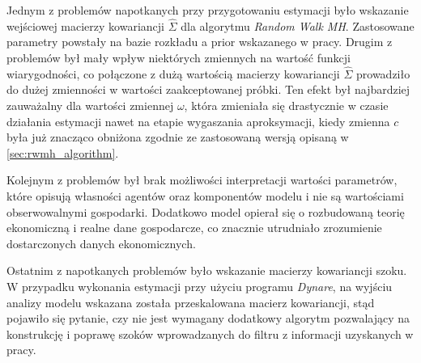 Jednym z problemów napotkanych przy przygotowaniu estymacji było wskazanie wejściowej macierzy kowariancji $\hat{\Sigma}$ dla algorytmu \emph{Random Walk MH}. Zastosowane parametry powstały na bazie rozkładu a prior wskazanego w pracy. Drugim z problemów był mały wpływ niektórych zmiennych na wartość funkcji wiarygodności, co połączone z dużą wartością macierzy kowariancji $\hat{\Sigma}$ prowadziło do dużej zmienności w wartości zaakceptowanej próbki. Ten efekt był najbardziej zauważalny dla wartości zmiennej $\omega$, która zmieniała się drastycznie w czasie działania estymacji nawet na etapie wygaszania aproksymacji, kiedy zmienna $c$ była już znacząco obniżona zgodnie ze zastosowaną wersją opisaną w \ref{sec:rwmh_algorithm}.

Kolejnym z problemów był brak możliwości interpretacji wartości parametrów, które opisują własności agentów oraz komponentów modelu i nie są wartościami obserwowalnymi gospodarki. Dodatkowo model opierał się o rozbudowaną teorię ekonomiczną i realne dane gospodarcze, co znacznie utrudniało zrozumienie dostarczonych danych ekonomicznych. 

Ostatnim z napotkanych problemów było wskazanie macierzy kowariancji szoku. W przypadku wykonania estymacji przy użyciu programu \emph{Dynare}, na wyjściu analizy modelu wskazana została przeskalowana macierz kowariancji, stąd pojawiło się pytanie, czy nie jest wymagany dodatkowy algorytm pozwalający na konstrukcję i poprawę szoków wprowadzanych do filtru z informacji uzyskanych w pracy. 

